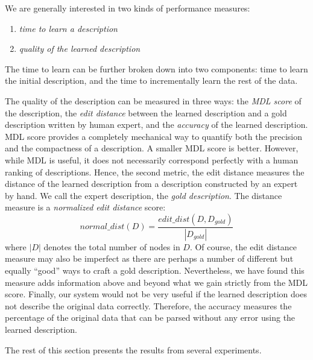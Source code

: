 We are generally interested in two kinds of performance measures: 
\begin{enumerate}
\item {\em time to learn a description} 
\item {\em quality of the learned description} 
\end{enumerate}

The time to learn can be further
broken down into two components: time to learn the initial description,
and the time to incrementally learn the rest of the data.

The quality of the description can be measured in three ways:
the {\em MDL score} of the description, the {\em edit distance} between the learned
description and a gold description written by human expert, and the {\em accuracy}
of the learned description.  MDL score 
provides a completely mechanical way to quantify both the
precision and the compactness of a description.  A smaller MDL score is better.
However, while MDL is useful, it does not necessarily correspond
perfectly with a human ranking of descriptions.
Hence, the second metric, the edit distance measures the distance of
the learned description from a description constructed by an expert
by hand.  We call the expert description, the {\em gold description}.
The distance measure is a {\em normalized edit distance} score:
\[normal\_dist(D) = \frac{edit\_dist(D, D_{gold})}{|D_{gold}|}\]
where $|D|$ denotes the total number of nodes in $D$.
Of course, the edit distance measure may also be imperfect as there are
perhaps a number of different but equally ``good'' ways 
to craft a gold description.  Nevertheless, we have found this measure
adds information above and beyond what we gain strictly from the MDL score.
Finally, our system would not be very useful if the learned description 
does not describe the original data correctly. Therefore,
the accuracy measures the percentage of the original data that
can be parsed without any error using the learned description.

The rest of this section presents the results 
from several experiments.

